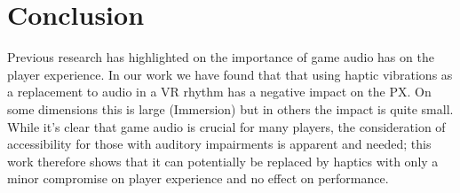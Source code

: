 \documentclass[manuscript,screen]{acmart}
\begin{document}
\section{Conclusion}
Previous research has highlighted on the importance of game audio has on the player experience. In our work we have found that that using haptic vibrations as a replacement to audio in a VR rhythm has a negative impact on the PX. On some dimensions this is large (Immersion) but in others the impact is quite small. While it's clear that game audio is crucial for many players, the consideration of accessibility for those with auditory impairments is apparent and needed\cite{mirzaei2020earvr}; this work therefore shows that it can potentially be replaced by haptics with only a minor compromise on player experience and no effect on performance.  
\end{document}
